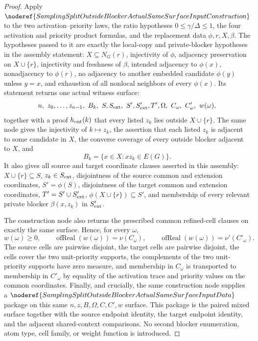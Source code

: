 \begin{proof}
Apply
\(\noderef{SamplingSplitOutsideBlockerActualSameSurfaceInputConstruction}\)
to the two activation--priority laws, the ratio hypotheses
\(0\le\gamma/\Delta\le1\), the four activation and priority product
formulas, and the replacement data \(\phi,r,X,\beta\).  The hypotheses passed
to it are exactly the local-copy and private-blocker hypotheses in the
assembly statement: \(X\subseteq N_G(r)\), injectivity of \(\phi\),
adjacency preservation on \(X\cup\{r\}\), injectivity and freshness of
\(\beta\), intended adjacency to \(\phi(x)\), nonadjacency to \(\phi(r)\), no
adjacency to another embedded candidate \(\phi(y)\) unless \(y=x\), and
exhaustion of all nonlocal neighbors of every \(\phi(x)\).  Its statement returns
one actual witness surface:
\[
  n,\ z_0,\ldots,z_{n-1},\ B_k,\ S,S_{\rm ext},\ S',S'_{\rm ext},T',
  \Omega,\ C_\omega,\ C'_\omega,\ w(\omega),
\]
together with a proof \(h_{\rm out}(k)\) that every listed \(z_k\) lies
outside \(X\cup\{r\}\).  The same node gives the injectivity of
\(k\mapsto z_k\), the assertion that each listed \(z_k\) is adjacent to some
candidate in \(X\), the converse coverage of every outside blocker adjacent
to \(X\), and
\[
  B_k=\{x\in X:xz_k\in E(G)\}.
\]
It also gives all source and target coordinate clauses asserted in this
assembly: \(X\cup\{r\}\subseteq S\), \(z_k\in S_{\rm ext}\), disjointness of
the source common and extension coordinates, \(S'=\phi(S)\), disjointness of
the target common and extension coordinates, \(T'=S'\cup S'_{\rm ext}\),
\(\phi(X\cup\{r\})\subseteq S'\), and membership of every relevant private
blocker \(\beta(x,z_k)\) in \(S'_{\rm ext}\).

The construction node also returns the prescribed common refined-cell
clauses on exactly the same surface.  Hence, for every \(\omega\),
\[
  w(\omega)\ge0,\qquad
  \operatorname{ofReal}(w(\omega))=\nu(C_\omega),\qquad
  \operatorname{ofReal}(w(\omega))=\nu'(C'_\omega).
\]
The source cells are pairwise disjoint, the target cells are pairwise
disjoint, the cells cover the two unit-priority supports, the complements of
the two unit-priority supports have zero measure, and membership in
\(C_\omega\) is transported to membership in \(C'_\omega\) by equality of the
activation trace and priority values on the common coordinates.  Finally, and
crucially, the same construction node supplies a
\(\noderef{SamplingSplitOutsideBlockerActualSameSurfaceInputData}\) package
on this same \(n,z,B,\Omega,C,C',w\) surface.  This package is the paired
mixed surface together with the source endpoint identity, the target endpoint
identity, and the adjacent shared-context comparisons.  No second blocker
enumeration, atom type, cell family, or weight function is introduced.


\end{proof}
